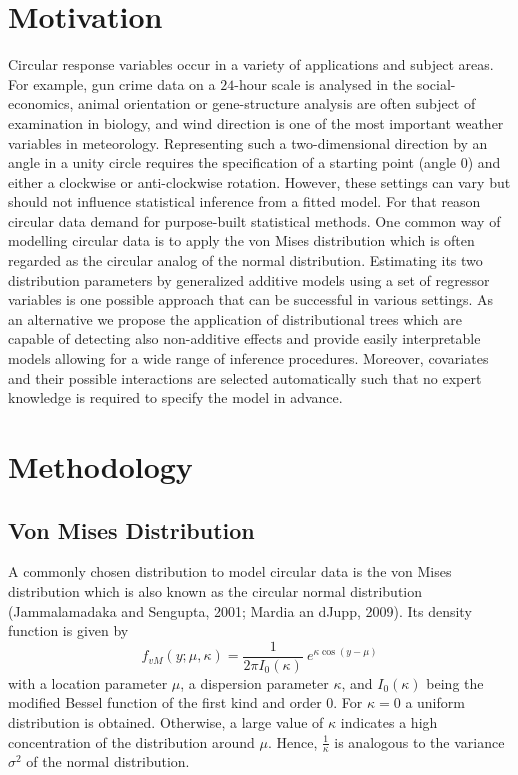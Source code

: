 \documentclass[twoside]{report}
\begin{document}
\section{Motivation}
Circular response variables occur in a variety of applications and subject areas. 
For example, gun crime data on a $24$-hour scale is analysed in the social-economics, 
animal orientation or gene-structure analysis are often subject of examination in biology, 
and wind direction is one of the most important weather variables in meteorology.
Representing such a two-dimensional direction by an angle in a unity circle requires 
the specification of a starting point (angle 0) and either a clockwise or anti-clockwise 
rotation. However, these settings can vary but should not influence statistical 
inference from a fitted model.
For that reason circular data demand for purpose-built statistical methods. 
One common way of modelling circular data is to apply the von Mises distribution 
which is often regarded as the circular analog of the normal distribution. 
Estimating its two distribution parameters by generalized additive models 
using a set of regressor variables is one possible approach that can be successful 
in various settings.
As an alternative we propose the application of distributional trees 
which are capable of detecting also non-additive effects and provide easily interpretable 
models allowing for a wide range of inference procedures.
Moreover, covariates and their possible interactions are selected automatically
such that no expert knowledge is required to specify the model in advance.

\section{Methodology}

\subsection{Von Mises Distribution}
A commonly chosen distribution to model circular data is the von Mises distribution
which is also known as the circular normal distribution 
(Jammalamadaka and Sengupta, 2001; Mardia an dJupp, 2009). 
Its density function is given by
\begin{equation}
  f_{vM}(y; \mu, \kappa) = \frac{1}{2 \pi I_0(\kappa)}~e^{ \kappa \cos(y - \mu)}\label{equ:vm}
\end{equation}
with a location parameter $\mu$, a dispersion parameter $\kappa$, and $I_0(\kappa)$ being the 
modified Bessel function of the first kind and order $0$.
For $\kappa=0$ a uniform distribution is obtained. Otherwise, a large value of $\kappa$ indicates
a high concentration of the distribution around $\mu$. Hence, $\frac{1}{\kappa}$ is analogous
to the variance $\sigma^2$ of the normal distribution.
\end{document}

